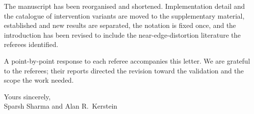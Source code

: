 \documentclass[11pt]{article}
\begin{document}
The manuscript has been reorganised and shortened. Implementation detail and the
catalogue of intervention variants are moved to the supplementary material,
established and new results are separated, the notation is fixed once, and the
introduction has been revised to include the near-edge-distortion literature the
referees identified.

A point-by-point response to each referee accompanies this letter. We are grateful
to the referees; their reports directed the revision toward the validation and the
scope the work needed.

\bigskip
\noindent Yours sincerely,\\
\noindent Sparsh Sharma and Alan R.\ Kerstein
\end{document}
